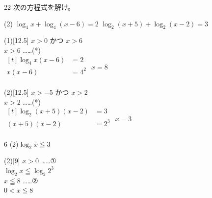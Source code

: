 \documentclass[14pt,dvipdfmx]{jsarticle}
\begin{document}
\begin{practiceprob}{22}
  次の方程式を解け。
  \begin{tasks}[label=(\arabic*), label-width=1.6zw, item-indent=2zw, after-item-skip=0.06em](2)
    \task $\log_{4} x+\log_{4}(x-6)=2$
    \task $\log_{2}(x+5)+\log_{2}(x-2)=3$
  \end{tasks}
\end{practiceprob}
\begin{answerbox}{(1)}[12.5]
  $x>0$ かつ $x>6$ \\
  $x>6$ \quad ……(*)\\
  $\begin{aligned}[t]
    \log_{4} x(x-6) &= 2 \\
    x(x-6) &= 4^{2} \\
  \end{aligned}$
   $x=8$
  \end{answerbox}
\vspace{-0.15em}
\begin{answerbox}{(2)}[12.5]
  $x>-5$ かつ $x>2$ \\
  $x>2$ \quad ……(*)\\
  $\begin{aligned}[t]
    \log_{2}(x+5)(x-2) &= 3 \\
    (x+5)(x-2) &= 2^{3} \\
  \end{aligned}$
   $x=3$
\end{answerbox}

\vfill
\nextpage

\vspace{-0.25em}
\begin{exampleprob}{6}
  (2)\quad $\log_{2} x \leqq 3$
\end{exampleprob}
\begin{answerbox}{(2)}[9]
  $x>0$ \quad ……①\\
  $\log_{2} x \leqq \log_{2} 2^{3}$ \\
  $x \leqq 8$ \quad ……② \\
   $0<x\leqq 8$
\end{answerbox}
\vspace{-0.5em}
\end{document}

